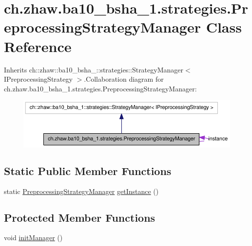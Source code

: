 \hypertarget{classch_1_1zhaw_1_1ba10__bsha__1_1_1strategies_1_1PreprocessingStrategyManager}{
\section{ch.zhaw.ba10\_\-bsha\_\-1.strategies.PreprocessingStrategyManager Class Reference}
\label{classch_1_1zhaw_1_1ba10__bsha__1_1_1strategies_1_1PreprocessingStrategyManager}
}


Inherits ch::zhaw::ba10\_\-bsha\_::strategies::StrategyManager$<$ IPreprocessingStrategy $>$.Collaboration diagram for ch.zhaw.ba10\_\-bsha\_\-1.strategies.PreprocessingStrategyManager:\nopagebreak
\begin{figure}[H]
\begin{center}
\leavevmode
\includegraphics[width=400pt]{classch_1_1zhaw_1_1ba10__bsha__1_1_1strategies_1_1PreprocessingStrategyManager__coll__graph}
\end{center}
\end{figure}
\subsection*{Static Public Member Functions}
\begin{DoxyCompactItemize}
\item 
static \hyperlink{classch_1_1zhaw_1_1ba10__bsha__1_1_1strategies_1_1PreprocessingStrategyManager}{PreprocessingStrategyManager} \hyperlink{classch_1_1zhaw_1_1ba10__bsha__1_1_1strategies_1_1PreprocessingStrategyManager_a735eb5e52177dd2ce40e0f4046682e8b}{getInstance} ()
\end{DoxyCompactItemize}
\subsection*{Protected Member Functions}
\begin{DoxyCompactItemize}
\item 
void \hyperlink{classch_1_1zhaw_1_1ba10__bsha__1_1_1strategies_1_1PreprocessingStrategyManager_a98df5bed9cdf63350bd5d87ab24f7f1e}{initManager} ()
\end{DoxyCompactItemize}
